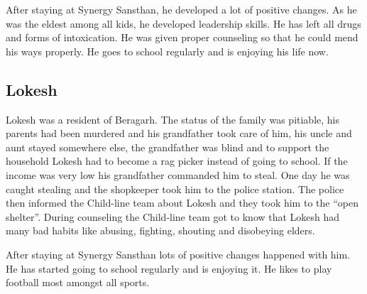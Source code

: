 After staying at Synergy Sansthan, he developed a lot of positive changes. As he was the eldest among all kids, he developed leadership skills. He has left all drugs and forms of intoxication. He was given proper counseling so that he could mend his ways properly. He goes to school regularly and is enjoying his life now.
\subsection{Lokesh}
Lokesh was a resident of Beragarh. The status of the family was pitiable, his parents had been murdered and his grandfather took care of him, his uncle and aunt stayed somewhere else, the grandfather was blind and to support the household Lokesh had to become a rag picker instead of going to school. If the income was very low his grandfather commanded him to steal. One day he was caught stealing and the shopkeeper took him to the police station. The police then informed the Child-line team about Lokesh and they took him to the ``open shelter''. During counseling the Child-line team got to know that Lokesh had many bad habits like abusing, fighting, shouting and disobeying elders.

After staying at Synergy Sansthan lots of positive changes happened with him. He has started going to school regularly and is enjoying it. He likes to play football most amongst all sports. 





